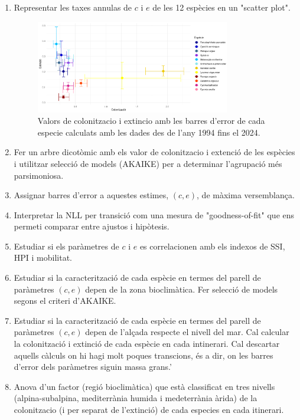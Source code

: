 \documentclass{article}
\begin{document}
\begin{enumerate}
    \item Representar les taxes annulas de $c$ i $e$ de les 12 esp\`ecies en un "scatter plot". 

     \begin{figure}[h!] %
    \centering %
    \includegraphics[width=0.8\textwidth]{colext_total.png} %
    \caption{Valors de colonitzacio i extincio amb les barres d'error de cada especie calculats amb les dades des de l'any 1994 fins el 2024. } %
    \label{fig:mi_imagen} %
\end{figure}

    \item Fer un arbre dicot\`omic amb els valor de colonitzacio i extenci\'o de les esp\`ecies i utilitzar selecci\'o de models (AKAIKE) per a determinar l'agrupaci\'o m\'es parsimoniosa. 
    
    \item Assignar barres d'error a aquestes estimes, $(c, e)$, de m\`axima versemblan\c{c}a.
    
    \item Interpretar la NLL per transici\'o com una mesura de "goodness-of-fit" que ens permeti comparar entre ajustos i hip\`otesis. 
    
    \item Estudiar si els par\`ametres de $c$ i $e$ es correlacionen amb els indexos de SSI, HPI i mobilitat.  
    
    \item Estudiar si la caracteritzaci\'o de cada esp\`ecie en termes del parell de par\`ametres $(c, e)$ depen de la zona bioclim\`atica. Fer selecci\'o de models segons el criteri d'AKAIKE. 
    
    \item Estudiar si la caracteritzaci\'o de cada esp\`ecie en termes del parell de par\`ametres $(c, e)$ depen de l'al\c{c}ada respecte el nivell del mar. Cal calcular la colonitzaci\'o i extinci\'o de cada esp\`ecie en cada intinerari. Cal descartar aquells c\`alculs on hi hagi molt poques transcions, \'es a dir, on les barres d'error dels par\`ametres siguin massa grans.'
    
    \item Anova d'un factor (regi\'o bioclim\`atica) que est\`a classificat en tres nivells (alpina-subalpina, mediterr\`ania humida i medeterr\`ania \`arida) de la colonitzacio (i per separat de l'extinci\'o) de cada especies en cada itinerari. 
\end{enumerate}
\end{document}
